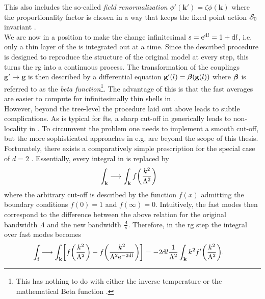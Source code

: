 This also includes the so-called \emph{field renormalization} $\phi'(\textbf{k}') = \zeta \phi(\textbf{k})$ where the proportionality factor is chosen in a way that keeps the fixed point action $\mathcal{S}_0$ invariant \cites[]{Bosonization_Shankar_1994}[]{AltlandSimons}.\\
We are now in a position to make the change infinitesimal $s=\text{e}^{\text{d} l} = 1 + \text{d} l$, i.e. only a thin layer of the \tpspace{} is integrated out at a time.
Since the described procedure is designed to reproduce the structure of the original model at every step, this turns the \gls{rg} into a continuous process.
The transformation of the couplings $\textbf{g}'\rightarrow \textbf{g}$ is then described by a differential equation $\textbf{g}'(l) = \bm{\beta}(\textbf{g}(l))$ where $\bm{\beta}$ is referred to as the \emph{beta function}\footnote{This has nothing to do with either the inverse temperature or the mathematical Beta function \cite[]{AltlandSimons}.}.
The advantage of this is that the fast averages are easier to compute for infinitesimally thin shells in \tpspace{}.\\
However, beyond the tree-level the procedure laid out above leads to subtle complications.
As is typical for \glspl{ft}, a sharp cut-off in \tpspace{} generically leads to non-locality in \trspace{}.
To circumvent the problem one needs to implement a smooth cut-off, but the more sophisticated approaches in e.g. \cites{RG_SG_Wilson_Sharp_vs_Smooth_Kogut_1979}{RG_Wilson_SmoothCutoff_Nozieres_1987} are beyond the scope of this thesis.
Fortunately, there exists a comparatively simple prescription for the special case of $d=2$ \cite[]{RG_QFT_Dupuis_2025}.
Essentially, every integral in \tpspace{} is replaced by
\begin{align*}
\int_\textbf{k} &\longrightarrow \int_\textbf{k} f\kla*{\frac{k^2}{\Lambda^2}}
\end{align*}
where the arbitrary cut-off is described by the function $f(x)$ admitting the boundary conditions $f(0)=1$ and $f(\infty)=0$.
Intuitively, the fast modes then correspond to the difference between the above relation for the original bandwidth $\Lambda$ and the new bandwidth $\frac{\Lambda}{s}$.
Therefore, in the \gls{rg} step the integral over fast modes becomes
\begin{align*}
\int_\f &\longrightarrow \int_\textbf{k} \klb[\bigg]{f\kla*{\frac{k^2}{\Lambda^2}} - f\kla[\bigg]{\frac{k^2}{\Lambda^2\powe{-2\d l}}}} = -2\d l \frac{1}{\Lambda^2} \int_\textbf{k} k^2 f'\kla*{\frac{k^2}{\Lambda^2}}.
\end{align*}
